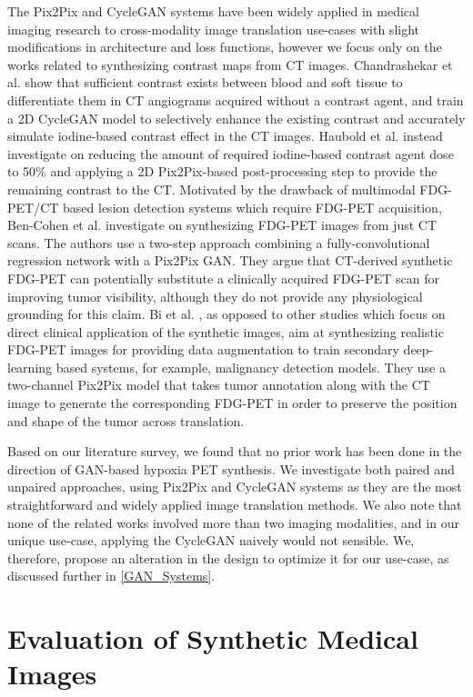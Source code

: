 The Pix2Pix and CycleGAN systems have been widely applied in medical imaging research to cross-modality image translation use-cases \cite{yi2019generative} with slight modifications in architecture and loss functions, however we focus only on the works related to synthesizing contrast maps from CT images. Chandrashekar et al. \cite{chandrashekar2020deep} show that sufficient contrast exists between blood and soft tissue to differentiate them in CT angiograms acquired without a contrast agent, and train a 2D CycleGAN model to selectively enhance the existing contrast and accurately simulate iodine-based contrast effect in the CT images. Haubold et al. \cite{haubold2021contrast} instead investigate on reducing the amount of required iodine-based contrast agent dose to 50\% and applying a 2D Pix2Pix-based post-processing step to provide the remaining contrast to the CT. Motivated by the drawback of multimodal FDG-PET/CT based lesion detection systems which require FDG-PET acquisition, Ben-Cohen et al. \cite{bencohen2018crossmodality} investigate on synthesizing FDG-PET images from just CT scans. The authors use a two-step approach combining a fully-convolutional regression network with a Pix2Pix GAN. They argue that CT-derived synthetic FDG-PET can potentially substitute a clinically acquired FDG-PET scan for improving tumor visibility, although they do not provide any physiological grounding for this claim. Bi et al. \cite{bi2017synthesis}, as opposed to other studies which focus on direct clinical application of the synthetic images, aim at synthesizing realistic FDG-PET images for providing data augmentation to train secondary deep-learning based systems, for example, malignancy detection models. They use a two-channel Pix2Pix model that takes tumor annotation along with the CT image to generate the corresponding FDG-PET in order to preserve the position and shape of the tumor across translation. 

Based on our literature survey, we found that no prior work has been done in the direction of GAN-based hypoxia PET synthesis. We investigate both paired and unpaired approaches, using Pix2Pix and CycleGAN systems as they are the most straightforward and widely applied image translation methods. We also note that none of the related works involved more than two imaging modalities, and in our unique use-case, applying the CycleGAN naively would not sensible. We, therefore, propose an alteration in the design to optimize it for our use-case, as discussed further in \ref{GAN_Systems}.



\section{Evaluation of Synthetic Medical Images}
